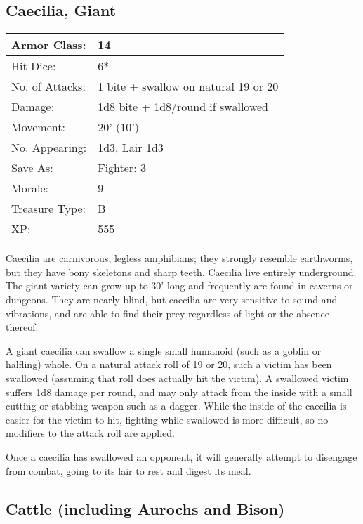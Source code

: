 \documentclass[a4paper,twoside,openany,10pt]{book}
\begin{document}
\begin{multicols}{2}
\subsection*{Caecilia, Giant}\label{caecilia-giant}

\begin{tabularx}{0.48\textwidth}{@{}lX@{}}
Armor Class: & 14 \\\hline
Hit Dice: & 6* \\\hline
No. of Attacks: & 1 bite + swallow on natural 19 or 20 \\\hline
Damage: & 1d8 bite + 1d8/round if swallowed \\\hline
Movement: & 20' (10') \\\hline
No. Appearing: & 1d3, Lair 1d3 \\\hline
Save As: & Fighter: 3 \\\hline
Morale: & 9 \\\hline
Treasure Type: & B \\\hline
XP: & 555 \\\hline
\end{tabularx}\medskip

Caecilia are carnivorous, legless amphibians; they strongly resemble earthworms, but they have bony skeletons and sharp teeth. Caecilia live entirely underground. The giant variety can grow up to 30' long and frequently are found in caverns or dungeons. They are nearly blind, but caecilia are very sensitive to sound and vibrations, and are able to find their prey regardless of light or the absence thereof.

A giant caecilia can swallow a single small humanoid (such as a goblin or halfling) whole. On a natural attack roll of 19 or 20, such a victim has been swallowed (assuming that roll does actually hit the victim). A swallowed victim suffers 1d8 damage per round, and may only attack from the inside with a small cutting or stabbing weapon such as a dagger. While the inside of the caecilia is easier for the victim to hit, fighting while swallowed is more difficult, so no modifiers to the attack roll are applied.

Once a caecilia has swallowed an opponent, it will generally attempt to disengage from combat, going to its lair to rest and digest its meal.


\subsection*{Cattle (including Aurochs and Bison)}\label{cattle-including-aurochs-and-bison}


\end{multicols}
\end{document}
